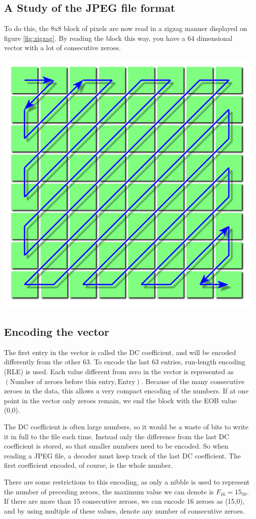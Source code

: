 \begin{infobox}{\section[A Study of the JPEG file format]{A Study of the JPEG file format}}
To do this, the 8x8 block of pixels are now read in a zigzag manner displayed on figure \ref{fig:zigzag}. By reading the block this way, you have a 64 dimensional vector with a lot of consecutive zeroes. 

\begin{centering}
\includegraphics[width=.5\textwidth]{figures/zigzagordering.png}
\label{fig:zigzag}
\end{centering} 

\subsection*{Encoding the vector}
The first entry in the vector is called the DC coefficient, and will be encoded differently from the other 63. To encode the last 63 entries, run-length encoding (RLE) is used. Each value different from zero in the vector is represented as $(\text{Number of zeroes before this entry}, \text{Entry})$. Because of the many consecutive zeroes in the data, this allows a very compact encoding of the numbers. If at one point in the vector only zeroes remain, we end the block with the EOB value (0,0). 

The DC coefficient is often large numbers, so it would be a waste of bits to write it in full to the file each time. Instead only the difference from the last DC coefficient is stored, so that smaller numbers need to be encoded. So when reading a JPEG file, a decoder must keep track of the last DC coefficient. The first coefficient encoded, of course, is the whole number.

There are some restrictions to this encoding, as only a nibble is used to represent the number of preceding zeroes, the maximum value we can denote is $F_{16}=15_{10}$. If there are more than 15 consecutive zeroes, we can encode 16 zeroes as (15,0), and by using multiple of these values, denote any number of consecutive zeroes. 


\end{infobox}

